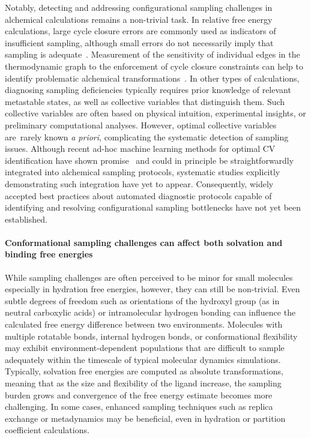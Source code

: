 \documentclass[9pt,bestpractices]{livecoms}
\begin{document}
Notably, detecting and addressing configurational sampling challenges in alchemical calculations remains a non-trivial task. In relative free energy calculations, large cycle closure errors are commonly used as indicators of insufficient sampling, although small errors do not necessarily imply that sampling is adequate~\cite{suruzhon2021sensitivity}. Measurement of the sensitivity of individual edges in the thermodynamic graph to the enforcement of cycle closure constraints can help to identify problematic alchemical transformations~\cite{giese2025transferability}. In other types of calculations, diagnosing sampling deficiencies typically requires prior knowledge of relevant metastable states, as well as collective variables that distinguish them. Such collective variables are often based on physical intuition, experimental insights, or preliminary computational analyses. However, optimal collective variables are rarely known \textit{a priori}, complicating the systematic detection of sampling issues. Although recent ad-hoc machine learning methods for optimal CV identification have shown promise~\cite{gokdemir2025machine, sidky2020machine, bonati2021deep} and could in principle be straightforwardly integrated into alchemical sampling protocols, systematic studies explicitly demonstrating such integration have yet to appear. Consequently, widely accepted best practices about automated diagnostic protocols capable of identifying and resolving configurational sampling bottlenecks have not yet been established. 

\paragraph{Conformational sampling challenges can affect both solvation and binding free energies}
While sampling challenges are often perceived to be minor for small molecules especially in hydration free energies, however, they can still be non-trivial. Even subtle degrees of freedom such as orientations of the hydroxyl group (as in neutral carboxylic acids) or intramolecular hydrogen bonding can influence the calculated free energy difference between two environments\cite{klimovich2010predicting, lim2019assessing}. Molecules with multiple rotatable bonds, internal hydrogen bonds, or conformational flexibility may exhibit environment-dependent populations that are difficult to sample adequately within the timescale of typical molecular dynamics simulations. Typically, solvation free energies are computed as absolute transformations, meaning that as the size and flexibility of the ligand increase, the sampling burden grows and convergence of the free energy estimate becomes more challenging. In some cases, enhanced sampling techniques such as replica exchange\cite{rest2} or metadynamics\cite{hsu2023alchemical, khuttan2024make} may be beneficial, even in hydration or partition coefficient calculations.
\end{document}
